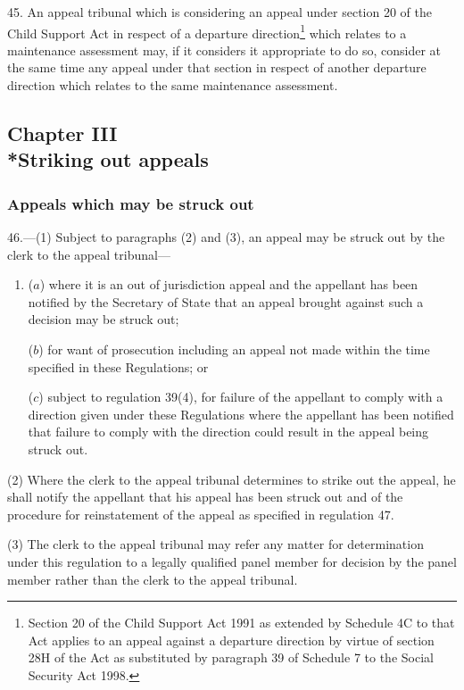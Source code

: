 \documentclass[12pt,a4paper]{article}
\begin{document}
45.  An appeal tribunal which is considering an appeal under section 20 of the Child Support Act in respect of a departure direction\footnote{\frenchspacing Section 20 of the Child Support Act 1991 as extended by Schedule 4C to that Act applies to an appeal against a departure direction by virtue of section 28H of the Act as substituted by paragraph 39 of Schedule 7 to the Social Security Act 1998.} which relates to a maintenance assessment may, if it considers it appropriate to do so, consider at the same time any appeal under that section in respect of another departure direction which relates to the same maintenance assessment.

\subsection[Chapter III --- Striking out appeals]{Chapter III\\*Striking out appeals}

\subsubsection[46. Appeals which may be struck out]{Appeals which may be struck out}

\renewcommand\parthead{--- Part V Chapter III}

46.—(1) Subject to paragraphs (2) and (3), an appeal may be struck out by the clerk to the appeal tribunal—
\begin{enumerate}\item[]
($a$) where it is an out of jurisdiction appeal and the appellant has been notified by the Secretary of State that an appeal brought against such a decision may be struck out;

($b$) for want of prosecution including an appeal not made within the time specified in these Regulations; or

($c$) subject to regulation 39(4), for failure of the appellant to comply with a direction given under these Regulations where the appellant has been notified that failure to comply with the direction could result in the appeal being struck out.
\end{enumerate}

(2) Where the clerk to the appeal tribunal determines to strike out the appeal, he shall notify the appellant that his appeal has been struck out and of the procedure for reinstatement of the appeal as specified in regulation 47.

(3) The clerk to the appeal tribunal may refer any matter for determination under this regulation to a legally qualified panel member for decision by the panel member rather than the clerk to the appeal tribunal.
\end{document}
